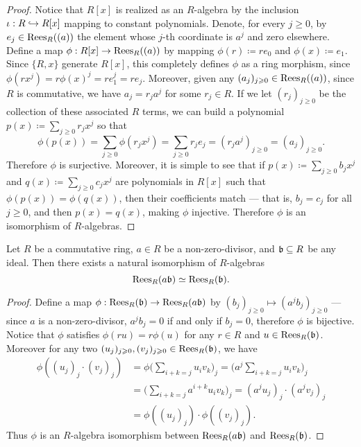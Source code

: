 \begin{proof}
Notice that \(R[x]\) is realized as an \(R\)-algebra by the inclusion
\(\iota: R \hookrightarrow R[x]\) mapping to constant polynomials. Denote, for every
\(j \geq 0\), by \(e_j \in \operatorname{Rees}_R((a))\) the element whose \(j\)-th coordinate
is \(a^j\) and zero elsewhere. Define a map \(\phi: R[x] \to \operatorname{Rees}_R((a))\) by
mapping \(\phi(r) \coloneq r e_0\) and \(\phi(x) \coloneq e_1\).  Since
\(\{R, x\}\) generate \(R[x]\), this completely defines \(\phi\) as a ring
morphism, since \(\phi(r x^j) = r \phi(x)^j = r e_1^j = r e_j\). Moreover,
given any \((a_j)_{j \geqslant 0} \in \operatorname{Rees}_R((a))\), since \(R\) is commutative, we
have \(a_j = r_j a^j\) for some \(r_j \in R\). If we let \((r_j)_{j \geq 0}\) be
the collection of these associated \(R\) terms, we can build a polynomial \(p(x)
\coloneq \sum_{j \geq 0} r_j x^j\) so that
\[
\phi(p(x)) = \sum_{j \geq 0} \phi(r_j x^j) = \sum_{j \geq 0} r_j e_j
= (r_j a^j)_{j \geq 0}
= (a_j)_{j \geq 0}.
\]
Therefore \(\phi\) is surjective. Moreover, it is simple to see that if
\(p(x) \coloneq \sum_{j \geq 0} b_j x^j\) and
\(q(x) \coloneq \sum_{j \geq 0} c_j x^j\) are polynomials in \(R[x]\) such that
\(\phi(p(x)) = \phi(q(x))\), then their coefficients match --- that is,
\(b_j = c_j\) for all \(j \geq 0\), and then \(p(x) = q(x)\), making \(\phi\)
injective. Therefore \(\phi\) is an isomorphism of \(R\)-algebras.
\end{proof}

\begin{proposition}
\label{prop:rees-iso-ideal-a*ideal}
Let \(R\) be a commutative ring, \(a \in R\) be a non-zero-divisor, and
\(\mathfrak{b} \subseteq R\) be any ideal. Then there exists a natural isomorphism
of \(R\)-algebras
\[
\operatorname{Rees}_R(a \mathfrak{b}) \simeq \operatorname{Rees}_R(\mathfrak{b}).
\]
\end{proposition}

\begin{proof}
Define a map \(\phi: \operatorname{Rees}_R(\mathfrak{b}) \to \operatorname{Rees}_R(a \mathfrak{b})\) by
\((b_j)_{j \geq 0} \mapsto (a^j b_j)_{j \geq 0}\) --- since \(a\) is a
non-zero-divisor, \(a^j b_j = 0\) if and only if \(b_j = 0\), therefore \(\phi\)
is bijective. Notice that \(\phi\) satisfies \(\phi(r u) = r \phi(u)\) for any
\(r \in R\) and \(u \in \operatorname{Rees}_R(\mathfrak{b})\). Moreover for any two \((u_j)_{j
  \geqslant 0}, (v_j)_{j \geqslant 0} \in \operatorname{Rees}_R(\mathfrak{b})\), we have
\begin{align*}
\phi((u_j)_j \cdot (v_j)_j)
&= \phi \bigg( \sum_{i + k = j} u_i v_k \bigg)_j
= \bigg( a^j \sum_{i + k = j} u_i v_k \bigg)_j \\
&= \bigg( \sum_{i + k = j} a^{i + k} u_i v_k \bigg)_j
= (a^j u_j)_j \cdot (a^j v_j)_j \\
&= \phi((u_j)_j) \cdot \phi((v_j)_j).
\end{align*}
Thus \(\phi\) is an \(R\)-algebra isomorphism between \(\operatorname{Rees}_R(a \mathfrak{b})\)
and \(\operatorname{Rees}_R(\mathfrak{b})\).
\end{proof}

